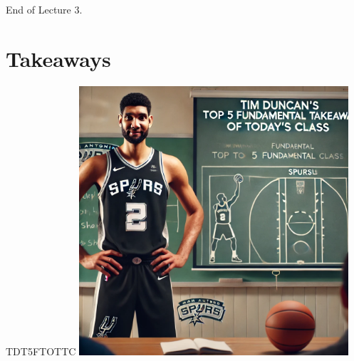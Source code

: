 \documentclass{beamer}
\begin{document}
\begin{frame}{}
    \centering
    \Huge End of Lecture 3.
\end{frame}

\section*{Takeaways}

\begin{frame}{TDT5FTOTTC}
    \centering
    \includegraphics[width=0.75\textwidth]{figures/tim.png}
\end{frame}
\end{document}
